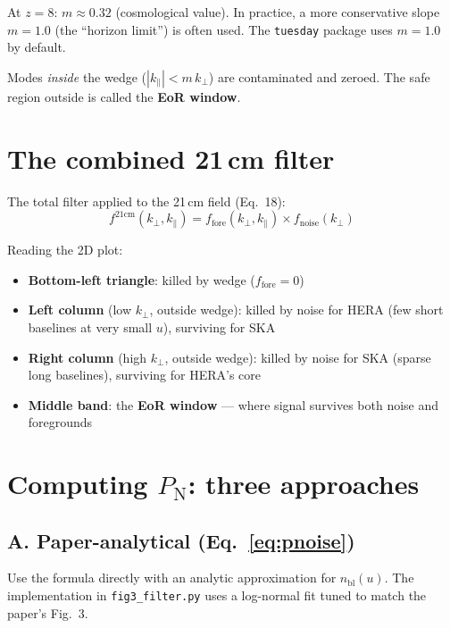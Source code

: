 \documentclass[11pt,a4paper]{article}
\newcommand{\kperp}{k_\perp}
\newcommand{\kpar}{k_\parallel}
\newcommand{\Pnoise}{P_\mathrm{N}}
\newcommand{\fnoise}{f_\mathrm{noise}}
\newcommand{\ffore}{f_\mathrm{fore}}
\newcommand{\nbl}{n_\mathrm{bl}}
\begin{document}
At $z=8$: $m \approx 0.32$ (cosmological value). In practice, a more conservative slope $m = 1.0$ (the ``horizon limit'') is often used. The \texttt{tuesday} package uses $m=1.0$ by default.

Modes \emph{inside} the wedge ($|\kpar| < m\,\kperp$) are contaminated and zeroed. The safe region outside is called the \textbf{EoR window}.

\section{The combined 21\,cm filter}

The total filter applied to the 21\,cm field (Eq.~18):
\begin{equation}\label{eq:total}
    \boxed{
    f^{21\mathrm{cm}}(\kperp, \kpar) = \ffore(\kperp, \kpar) \times \fnoise(\kperp)
    }
\end{equation}

Reading the 2D plot:
\begin{itemize}
    \item \textbf{Bottom-left triangle}: killed by wedge ($\ffore = 0$)
    \item \textbf{Left column} (low $\kperp$, outside wedge): killed by noise for HERA (few short baselines at very small $u$), surviving for SKA
    \item \textbf{Right column} (high $\kperp$, outside wedge): killed by noise for SKA (sparse long baselines), surviving for HERA's core
    \item \textbf{Middle band}: the \textbf{EoR window} --- where signal survives both noise and foregrounds
\end{itemize}

\section{Computing $\Pnoise$: three approaches}

\subsection{A. Paper-analytical (Eq.~\ref{eq:pnoise})}

Use the formula directly with an analytic approximation for $\nbl(u)$. The implementation in \texttt{fig3\_filter.py} uses a log-normal fit tuned to match the paper's Fig.~3.
\end{document}
